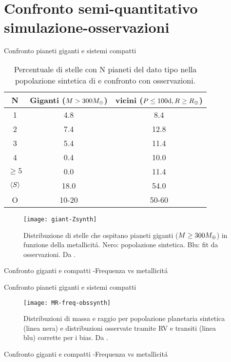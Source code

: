 \section{Confronto semi-quantitativo simulazione-osservazioni}

\begin{frame}{Confronto pianeti giganti e sistemi compatti}
\begin{table}
	\begin{tabular}{|ccc|}
		\hline
		N&Giganti ($M>300M_{\oplus}{}$)&vicini ($P\leq100\si{\day}, R\geq\rearth{}$)\\
		\hline
		1&4.8&8.4\\
		2&7.4&12.8\\
		3&5.4&11.4\\
		4&0.4&10.0\\
		$\geq5$&0.0&11.4\\
		$\langle S \rangle$&18.0&54.0\\
		O&10-20&50-60\\
		\hline
	\end{tabular}
	\caption{Percentuale di stelle con N pianeti del dato tipo nella popolazione sintetica di \cite{mordasini2018planetary} e confronto con osservazioni.}\label{tab:planetfreq}
\end{table}

\begin{figure}[!ht]
	\texttt{[image: giant-Zsynth]}
	\caption{Distribuzione di stelle che ospitano pianeti giganti ($M\geq300M_{\oplus}{}$) in funzione della metallicit\'a. Nero: popolazione sintetica. Blu: fit da osservazioni. Da \cite{mordasini2018planetary}. }\label{fig:giant-Zsynth}
\end{figure}
\end{frame}

\begin{wordonframe}{Confronto giganti e compatti -Frequenza vs metallicit\'a}

\end{wordonframe}

\begin{frame}{Confronto pianeti giganti e sistemi compatti}
\begin{figure}[!ht]\texttt{[image: MR-freq-obssynth]}\caption{Distribuzioni di massa e raggio per popolazione planetaria sintetica (linea nera) e distribuzioni osservate tramite RV e transiti (linea blu) corrette per i bias. Da \cite{mordasini2018planetary}.}\label{fig:MR-freq-obssynth}\end{figure}
\end{frame}

\begin{wordonframe}{Confronto giganti e compatti -Frequenza vs metallicit\'a}

\end{wordonframe}
